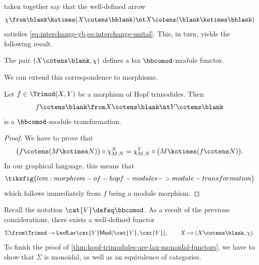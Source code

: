 taken together say that the well-defined arrow
\[
  \chi\from \blank \kotimes (X \cotens \bblank) \nt X \cotens (\blank \kotimes \bblank)
\]
satisfies \cref{eq:interchange-yb,eq:interchange-unital}.
This, in turn, yields the following result.

\begin{proposition}\label{prop:interchange-comodule-functor}
  The pair \((X \cotens \blank, \chi)\) defines a lax \(\bbcomod\)\hyp{}module functor.
\end{proposition}

We can extend this correspondence to morphisms.

\begin{lemma}\label{lem:morphism-of-hopf-modules->module-transformation}
  Let \(f \in \Trimod(X, Y)\) be a morphism of Hopf trimodules.
  Then
  \[
    f \cotens \blank \from X \cotens \blank \nt Y \cotens \blank
  \]
  is a \(\bbcomod\)\hyp{}module transformation.
\end{lemma}
\begin{proof}
  We have to prove that
  \[
    \big(f \cotens (M \kotimes N)\big) \circ \chi^X_{M, N}
    =
    \chi^Y_{M, N} \circ \big(M \kotimes (f \cotens N)\big).
  \]
  In our graphical language, this means that
  \[
    \tikzfig{lem:morphism-of-hopf-modules->module-transformation}
  \]
  which follows immediately from \(f\) being a module morphism.
\end{proof}

Recall the notation \(\cat{V} \defeq \bbcomod \).
As a result of the previous considerations,
there exists a well-defined functor
\begin{equation}\label{eq:hopf-trimod-to-lax-module-functors--functor-definition}
  \Sigma \from \Trimod \to \mathsf{LexfLax}\cat{V}\mathsf{Mod}(\cat{V}, \cat{V}), \qquad X \mapsto (X \cotens \blank, \chi).
\end{equation}
To finish the proof of \cref{thm:hopf-trimodules-are-lax-monoidal-functors},
we have to show that \(\Sigma\) is monoidal, as well as an equivalence of categories.

